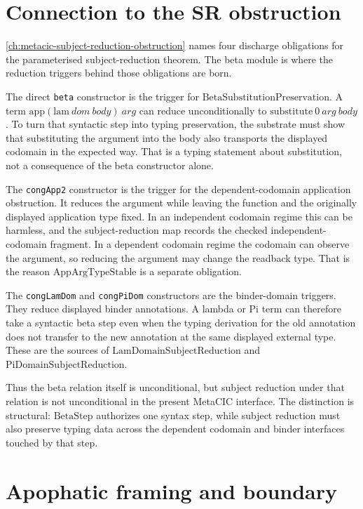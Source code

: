 \section{Connection to the SR obstruction}
\label{sec:metacic-beta-audit-map-sr-connection}

\autoref{ch:metacic-subject-reduction-obstruction} names four discharge
obligations for the parameterised subject-reduction theorem. The beta module is
where the reduction triggers behind those obligations are born.

The direct \texttt{beta} constructor is the trigger for
$\mathrm{BetaSubstitutionPreservation}$. A term
$\mathrm{app}(\mathrm{lam}\ dom\ body)\ arg$ can reduce unconditionally to
$\mathrm{substitute}\ 0\ arg\ body$. To turn that syntactic step into typing
preservation, the substrate must show that substituting the argument into the
body also transports the displayed codomain in the expected way. That is a
typing statement about substitution, not a consequence of the beta constructor
alone.

The \texttt{congApp2} constructor is the trigger for the dependent-codomain
application obstruction. It reduces the argument while leaving the function and
the originally displayed application type fixed. In an independent codomain
regime this can be harmless, and the subject-reduction map records the checked
independent-codomain fragment. In a dependent codomain regime the codomain can
observe the argument, so reducing the argument may change the readback type.
That is the reason $\mathrm{AppArgTypeStable}$ is a separate obligation.

The \texttt{congLamDom} and \texttt{congPiDom} constructors are the binder-domain
triggers. They reduce displayed binder annotations. A lambda or Pi term can
therefore take a syntactic beta step even when the typing derivation for the
old annotation does not transfer to the new annotation at the same displayed
external type. These are the sources of
$\mathrm{LamDomainSubjectReduction}$ and
$\mathrm{PiDomainSubjectReduction}$.

Thus the beta relation itself is unconditional, but subject reduction under that
relation is not unconditional in the present MetaCIC interface. The distinction
is structural: $\mathrm{BetaStep}$ authorizes one syntax step, while subject
reduction must also preserve typing data across the dependent codomain and
binder interfaces touched by that step.

\section{Apophatic framing and boundary}
\label{sec:metacic-beta-audit-map-boundary}


